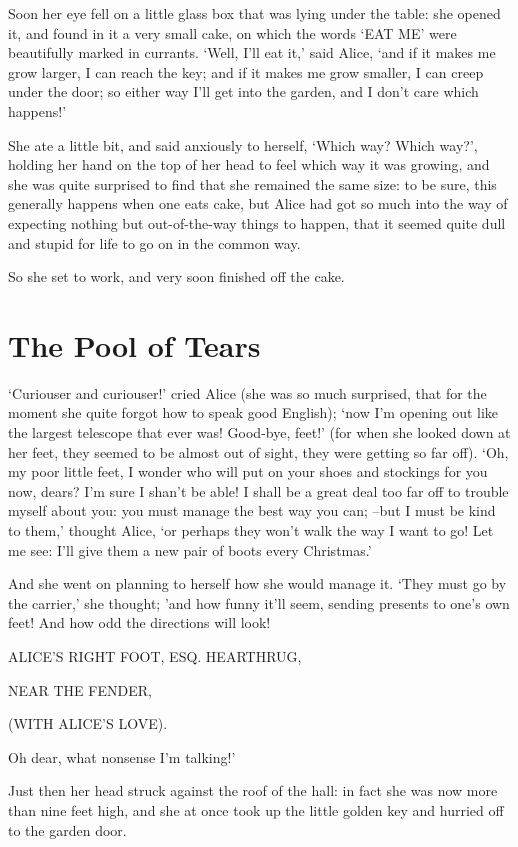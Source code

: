 \documentclass[statementpaper,twoside,openany]{memoir}
\begin{document}
Soon her eye fell on a little glass box that was lying under the table: she opened it, and found in it a very small cake, on which the words `EAT ME' were beautifully marked in currants. `Well, I'll eat it,' said Alice, `and if it makes me grow larger, I can reach the key; and if it makes me grow smaller, I can creep under the door; so either way I'll get into the garden, and I don't care which happens!'

She ate a little bit, and said anxiously to herself, `Which way? Which way?', holding her hand on the top of her head to feel which way it was growing, and she was quite surprised to find that she remained the same size: to be sure, this generally happens when one eats cake, but Alice had got so much into the way of expecting nothing but out-of-the-way things to happen, that it seemed quite dull and stupid for life to go on in the common way.

So she set to work, and very soon finished off the cake.

\chapter{The Pool of Tears}

`Curiouser and curiouser!' cried Alice (she was so much surprised, that for the moment she quite forgot how to speak good English); `now I'm opening out like the largest telescope that ever was! Good-bye, feet!' (for when she looked down at her feet, they seemed to be almost out of sight, they were getting so far off). `Oh, my poor little feet, I wonder who will put on your shoes and stockings for you now, dears? I'm sure I shan't be able! I shall be a great deal too far off to trouble myself about you: you must manage the best way you can; --but I must be kind to them,' thought Alice, `or perhaps they won't walk the way I want to go! Let me see: I'll give them a new pair of boots every Christmas.'

And she went on planning to herself how she would manage it. `They must go by the carrier,' she thought; 'and how funny it'll seem, sending presents to one's own feet! And how odd the directions will look!

ALICE'S RIGHT FOOT, ESQ.
HEARTHRUG,

NEAR THE FENDER,

(WITH ALICE'S LOVE).

Oh dear, what nonsense I'm talking!'

Just then her head struck against the roof of the hall: in fact she was now more than nine feet high, and she at once took up the little golden key and hurried off to the garden door.
\end{document}
